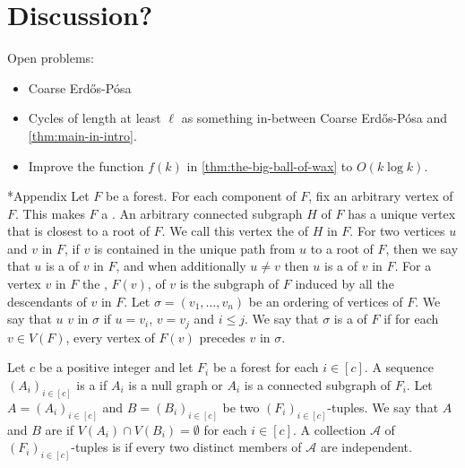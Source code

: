 \documentclass{patmorin}
\newenvironment{dummy}{}
\newcommand{\pat}[1]{\textcolor{Blue}{[Pat: #1]}}
\newcommand{\piotr}[1]{\textcolor{red}{Piotr: #1}}
\begin{document}
\begin{dummy}
\color{red}
\section{Discussion?}

Open problems:
\begin{itemize}
    \item Coarse Erd\H{o}s-Pósa
    \item Cycles of length at least $\ell$ as something in-between Coarse Erd\H{o}s-Pósa and \cref{thm:main-in-intro}.
    \item Improve the function $f(k)$ in \cref{thm:the-big-ball-of-wax} to $O(k\log k)$.
\end{itemize}
\end{dummy}




\section*{Appendix}
Let $F$ be a forest. 
For each component of $F$, fix an arbitrary vertex of $F$. This makes $F$ a . 
An arbitrary connected subgraph $H$ of $F$ has a unique vertex that is closest to a root of $F$. We call this vertex the  of $H$ in $F$. 
For two vertices $u$ and $v$ in $F$, 
if $v$ is contained in the unique path from $u$ to a root of $F$, then we say that $u$ is a  of $v$ in $F$, and when additionally $u\neq v$  then $u$ is a  of $v$ in $F$.
For a vertex $v$ in $F$ the , $F(v)$, of $v$ is the subgraph of $F$ induced by all the descendants of $v$ in $F$.
Let $\sigma=(v_1,\ldots,v_n)$ be an ordering of vertices of $F$. 
We say that $u$  $v$ in $\sigma$ if $u=v_i$, $v=v_j$ and $i\leq j$. 
We say that $\sigma$ is a  of $F$ if for each $v\in V(F)$, every vertex of $F(v)$ precedes $v$ in $\sigma$.

Let $c$ be a positive integer and 
let $F_i$ be a forest for each $i\in[c]$. 
A sequence $(A_i)_{i\in[c]}$ is a  if 
$A_i$ is a null graph or $A_i$ is a connected subgraph of $F_i$. 
Let $A=(A_i)_{i\in[c]}$ and $B=(B_i)_{i\in[c]}$ be two $(F_i)_{i\in[c]}$-tuples. 
We say that $A$ and $B$ are  if 
$V(A_i)\cap V(B_i)=\emptyset$ for each $i\in[c]$.
A collection $\mathcal{A}$ of $(F_i)_{i\in[c]}$-tuples is  if every two distinct members of $\mathcal{A}$ are independent.
\end{document}

